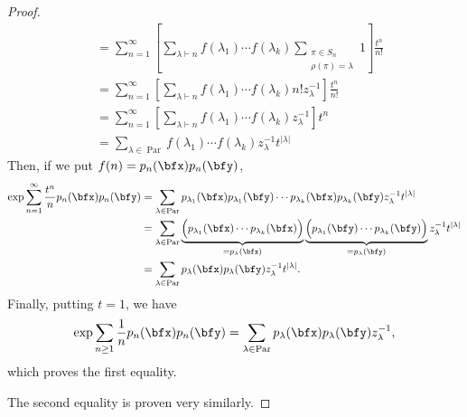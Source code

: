 \documentclass{article}
\DeclareMathOperator{\Par}{Par}
\begin{document}
\begin{proof}
\begin{align*}
        &=
        \sum_{n=1}^\infty
        \left[
            \sum_{\lambda \vdash n}
            f(\lambda_1) \cdots f(\lambda_k)
            \sum_{
                \substack{
                \pi \in S_n \\
                \rho(\pi) = \lambda
                }
            }
            1 
        \right]
        \frac{t^n}{n!} \\
        &=
        \sum_{n=1}^\infty
        \left[
            \sum_{\lambda \vdash n}
            f(\lambda_1) \cdots f(\lambda_k)
            n!
            z_\lambda^{-1}
        \right]
        \frac{t^n}{n!} \\
        &=
        \sum_{n=1}^\infty
        \left[
            \sum_{\lambda \vdash n}
            f(\lambda_1) \cdots f(\lambda_k)
            z_\lambda^{-1}
        \right]
        t^n \\
        &=
        \sum_{\lambda \in \Par}
        f(\lambda_1) \cdots f(\lambda_k) z_\lambda^{-1}
        t^{|\lambda|}
    \end{align*}
    Then, if we put $f(n) = p_n(\bfx)p_n(\bfy)$,
    \begin{align*}
        \exp
        \sum_{n=1}^\infty
        \frac{t^n}{n}
        p_n(\bfx) p_n(\bfy)
        &=
        \sum_{\lambda \in \Par}
        p_{\lambda_1}(\bfx) p_{\lambda_1}(\bfy)
        \cdots
        p_{\lambda_k}(\bfx) p_{\lambda_k}(\bfy)
        z_\lambda^{-1}
        t^{|\lambda|} \\
        &=
        \sum_{\lambda \in \Par}
        \underbrace{
            \Big(
                p_{\lambda_1}(\bfx) \cdots p_{\lambda_k}(\bfx)
            \Big)
        }_{=p_\lambda(\bfx)}
        \underbrace{
            \Big(
                p_{\lambda_1}(\bfy) \cdots p_{\lambda_k}(\bfy)
            \Big)
        }_{=p_\lambda(\bfy)}
        z_\lambda^{-1}
        t^{|\lambda|} \\
        &=
        \sum_{\lambda \in \Par}
        p_\lambda(\bfx) p_\lambda(\bfy) z_\lambda^{-1}
        t^{|\lambda|}.
    \end{align*}
    Finally, putting $t=1$, we have
    \[
        \exp
        \sum_{n \geq 1}
        \frac{1}{n}
        p_n(\bfx) p_n(\bfy)
        =
        \sum_{\lambda \in \Par}
        p_\lambda(\bfx) p_\lambda(\bfy) z_\lambda^{-1},
    \]
    which proves the first equality.

    The second equality is proven very similarly.


\end{proof}
\end{document}
